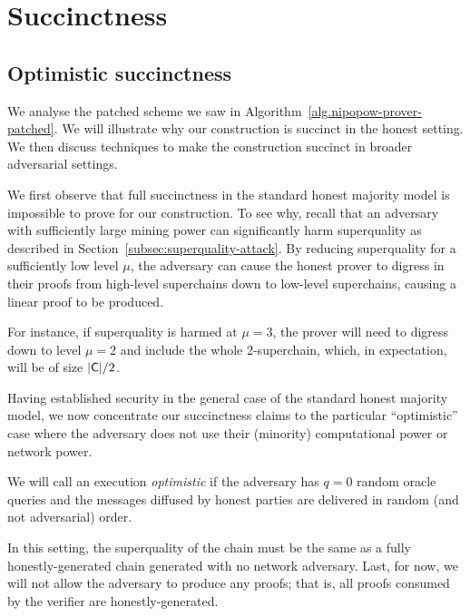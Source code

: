 \section{Succinctness}
\label{sec:app-succinctness}

\subsection{Optimistic succinctness}

We analyse the patched scheme we saw in
Algorithm~\ref{alg.nipopow-prover-patched}. We will illustrate why our
construction is succinct in the honest setting. We then discuss techniques to make the
construction succinct in broader adversarial settings.

We first observe that full succinctness in the standard honest majority model is
impossible to prove for our construction. To see why, recall that an adversary
with sufficiently large mining power can significantly harm superquality as
described in Section~\ref{subsec:superquality-attack}. By reducing superquality
for a sufficiently low level $\mu$, the adversary can cause the honest prover to
digress in their proofs from high-level superchains down to low-level
superchains, causing a linear proof to be produced.

For instance, if superquality is harmed at $\mu = 3$, the prover will
need to digress down to level $\mu = 2$ and include the whole $2$-superchain,
which, in expectation, will be of size $|\mathsf{C}|/2$.

Having established security in the general case of the standard honest majority
model, we now concentrate our succinctness claims to the particular
``optimistic'' case where the adversary does not use their (minority)
computational power or network power.

\begin{definition}
  We will call an execution \emph{optimistic} if the adversary has $q = 0$
  random oracle queries and the messages diffused by honest parties are
  delivered in random (and not adversarial) order.
\end{definition}

In this setting, the superquality of the chain must be the same as a fully
honestly-generated chain generated with no network adversary. Last, for now, we
will not allow the adversary to produce any proofs; that is, all proofs consumed
by the verifier are honestly-generated.

